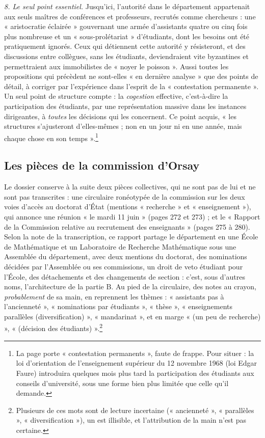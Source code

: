 \documentclass[11pt,a4paper]{article}
\begin{document}
\emph{8. Le seul point essentiel.} Jusqu'ici, l'autorité dans le département
appartenait aux seuls maîtres de conférences et professeurs, recrutés comme
chercheurs : une « aristocratie éclairée » gouvernant une armée d'assistants
quatre ou cinq fois plus nombreuse et un « sous-prolétariat » d'étudiants,
dont les besoins ont été pratiquement ignorés. Ceux qui détiennent cette
autorité y résisteront, et des discussions entre collègues, sans les
étudiants, deviendraient vite byzantines et permettraient aux immobilistes de
« noyer le poisson ». Aussi toutes les propositions qui précèdent ne sont-elles
« en dernière analyse » que des points de détail, à corriger par l'expérience
dans l'esprit de la « contestation permanente ». Un seul point de structure
compte : la \emph{cogestion} effective, c'est-à-dire la participation des
étudiants, par une représentation massive dans les instances dirigeantes, à
\emph{toutes} les décisions qui les concernent. Ce point acquis, « les
structures s'ajusteront d'elles-mêmes ; non en un jour ni en une année, mais
chaque chose en son temps ».\footnote{La page porte « contestation
permanents », faute de frappe. Pour situer : la loi d'orientation de
l'enseignement supérieur du 12 novembre 1968 (loi Edgar Faure) introduira
quelques mois plus tard la participation des étudiants aux conseils
d'université, sous une forme bien plus limitée que celle qu'il demande.}

\subsection*{Les pièces de la commission d'Orsay}

Le dossier conserve à la suite deux pièces collectives, qui ne sont pas de
lui et ne sont pas transcrites : une circulaire ronéotypée de la commission
sur les deux voies d'accès au doctorat d'État (mentions « recherche » et
« enseignement »), qui annonce une réunion « le mardi 11 juin » (pages 272
et 273) ; et le « Rapport de la Commission relative au recrutement des
enseignants » (pages 275 à 280). Selon la note de la transcription, ce
rapport partage le département en une École de Mathématique et un Laboratoire
de Recherche Mathématique sous une Assemblée du département, avec deux
mentions du doctorat, des nominations décidées par l'Assemblée ou ses
commissions, un droit de veto étudiant pour l'École, des détachements et des
changements de section : c'est, sous d'autres noms, l'architecture de la
partie B. Au pied de la circulaire, des notes au crayon, \emph{probablement}
de sa main, en reprennent les thèmes : « assistants pas à l'ancienneté »,
« nominations par étudiants », « thèse », « enseignements parallèles
(diversification) », « mandarinat », et en marge « (un peu de recherche) »,
« (décision des étudiants) ».\footnote{Plusieurs de ces mots sont de lecture
incertaine (« ancienneté », « parallèles », « diversification »), un est
illisible, et l'attribution de la main n'est pas certaine.}
\end{document}
